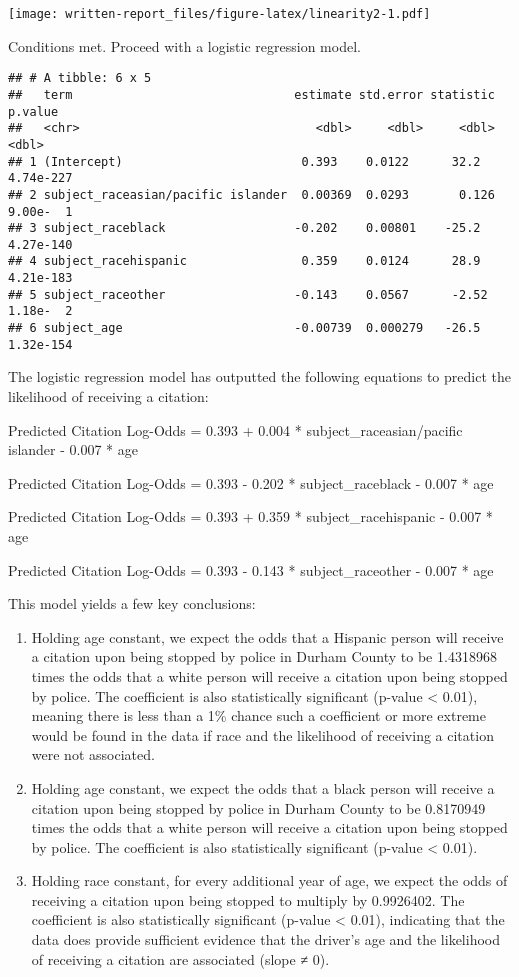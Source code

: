 \documentclass[
]{article}
\begin{document}
\texttt{[image: written-report\_files/figure-latex/linearity2-1.pdf]}

Conditions met. Proceed with a logistic regression model.

\begin{verbatim}
## # A tibble: 6 x 5
##   term                               estimate std.error statistic   p.value
##   <chr>                                 <dbl>     <dbl>     <dbl>     <dbl>
## 1 (Intercept)                         0.393    0.0122      32.2   4.74e-227
## 2 subject_raceasian/pacific islander  0.00369  0.0293       0.126 9.00e-  1
## 3 subject_raceblack                  -0.202    0.00801    -25.2   4.27e-140
## 4 subject_racehispanic                0.359    0.0124      28.9   4.21e-183
## 5 subject_raceother                  -0.143    0.0567      -2.52  1.18e-  2
## 6 subject_age                        -0.00739  0.000279   -26.5   1.32e-154
\end{verbatim}

The logistic regression model has outputted the following equations to
predict the likelihood of receiving a citation:

Predicted Citation Log-Odds = 0.393 + 0.004 * subject\_raceasian/pacific
islander - 0.007 * age

Predicted Citation Log-Odds = 0.393 - 0.202 * subject\_raceblack - 0.007
* age

Predicted Citation Log-Odds = 0.393 + 0.359 * subject\_racehispanic -
0.007 * age

Predicted Citation Log-Odds = 0.393 - 0.143 * subject\_raceother - 0.007
* age

This model yields a few key conclusions:

\begin{enumerate}
\def\labelenumi{\arabic{enumi}.}
\item
  Holding age constant, we expect the odds that a Hispanic person will
  receive a citation upon being stopped by police in Durham County to be
  1.4318968 times the odds that a white person will receive a citation
  upon being stopped by police. The coefficient is also statistically
  significant (p-value \textless{} 0.01), meaning there is less than a
  1\% chance such a coefficient or more extreme would be found in the
  data if race and the likelihood of receiving a citation were not
  associated.
\item
  Holding age constant, we expect the odds that a black person will
  receive a citation upon being stopped by police in Durham County to be
  0.8170949 times the odds that a white person will receive a citation
  upon being stopped by police. The coefficient is also statistically
  significant (p-value \textless{} 0.01).
\item
  Holding race constant, for every additional year of age, we expect the
  odds of receiving a citation upon being stopped to multiply by
  0.9926402. The coefficient is also statistically significant (p-value
  \textless{} 0.01), indicating that the data does provide sufficient
  evidence that the driver's age and the likelihood of receiving a
  citation are associated (slope ≠ 0).
\end{enumerate}
\end{document}
